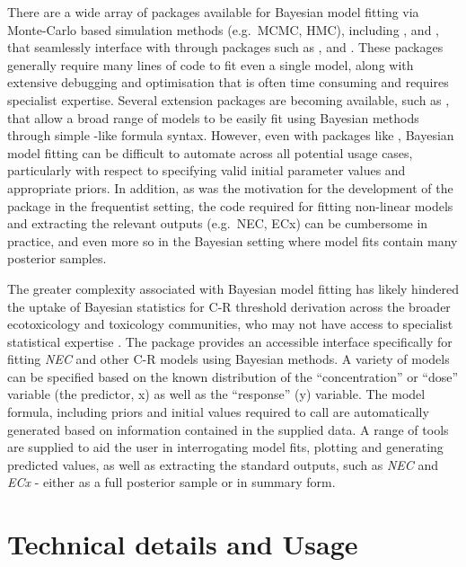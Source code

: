\documentclass[
]{jss}
\begin{document}
There are a wide array of packages available for Bayesian model fitting
via Monte-Carlo based simulation methods (e.g.~MCMC, HMC), including
 \citep{Lunn2000},  \citep{Plummer2003}
and  \citep{Carpenter2017}, that seamlessly interface
with  through packages such as , 
\citep{Su2015} and  \citep{rstan2020}. These packages
generally require many lines of code to fit even a single model, along
with extensive debugging and optimisation that is often time consuming
and requires specialist expertise. Several extension packages are
becoming available, such as  \citep{Burkner2017}, that allow a
broad range of models to be easily fit using Bayesian methods through
simple -like formula syntax. However, even with packages like
, Bayesian model fitting can be difficult to automate across
all potential usage cases, particularly with respect to specifying valid
initial parameter values and appropriate priors. In addition, as was the
motivation for the development of the  package in the
frequentist setting, the  code required for fitting
non-linear models and extracting the relevant outputs (e.g.~NEC, ECx)
can be cumbersome in practice, and even more so in the Bayesian setting
where model fits contain many posterior samples.

The greater complexity associated with Bayesian model fitting has likely
hindered the uptake of Bayesian statistics for C-R threshold derivation
across the broader ecotoxicology and toxicology communities, who may not
have access to specialist statistical expertise \citep{Fisher2019}. The
 package provides an accessible interface specifically for
fitting \emph{NEC} and other C-R models using Bayesian methods. A
variety of models can be specified based on the known distribution of
the ``concentration'' or ``dose'' variable (the predictor, x) as well as
the ``response'' (y) variable. The model formula, including priors and
initial values required to call  are automatically generated
based on information contained in the supplied data. A range of tools
are supplied to aid the user in interrogating model fits, plotting and
generating predicted values, as well as extracting the standard outputs,
such as \emph{NEC} and \emph{ECx} - either as a full posterior sample or
in summary form.

\hypertarget{technical-details-and-usage}{%
\section{Technical details and
Usage}\label{technical-details-and-usage}}
\end{document}
